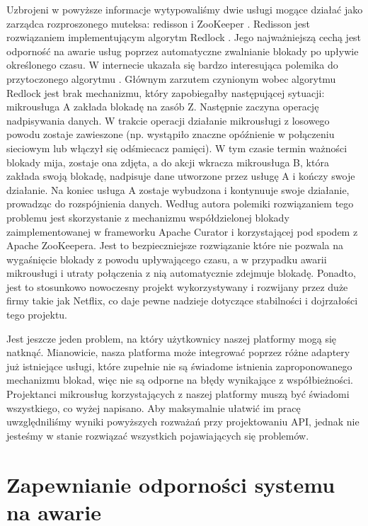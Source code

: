 \documentclass[licencjacka]{pracamgr}
\begin{document}
Uzbrojeni w powyższe informacje wytypowaliśmy dwie usługi mogące działać jako zarządca rozproszonego muteksa:
redisson \cite{redisson} i ZooKeeper \cite{zookeeper}. Redisson jest rozwiązaniem implementującym algorytm Redlock
\cite{redislock}. Jego najważniejszą cechą jest odporność na awarie usług poprzez automatyczne zwalnianie blokady
po upływie określonego czasu. W internecie ukazała się bardzo interesująca polemika do przytoczonego algorytmu \cite{redisbad}.
Głównym zarzutem czynionym wobec algorytmu Redlock jest brak mechanizmu, który zapobiegałby następującej sytuacji:
mikrousługa A zakłada blokadę na zasób Z. Następnie zaczyna operację nadpisywania danych. W trakcie operacji
działanie mikrousługi z losowego powodu zostaje zawieszone (np. wystąpiło znaczne opóźnienie w połączeniu sieciowym
lub włączył się odśmiecacz pamięci). W tym czasie termin ważności blokady mija, zostaje ona zdjęta, a do akcji
wkracza mikrousługa B, która zakłada swoją blokadę, nadpisuje dane utworzone przez usługę A i kończy swoje
działanie. Na koniec usługa A zostaje wybudzona i kontynuuje swoje działanie, prowadząc do rozspójnienia danych.
Według autora polemiki rozwiązaniem tego problemu jest skorzystanie z mechanizmu współdzielonej blokady
zaimplementowanej w frameworku Apache Curator \cite{curatorlock} i korzystającej pod spodem z Apache ZooKeepera.
Jest to bezpieczniejsze rozwiązanie które nie pozwala na wygaśnięcie blokady z powodu upływającego
czasu, a w przypadku awarii mikrousługi i utraty połączenia z nią
automatycznie zdejmuje blokadę. Ponadto, jest to stosunkowo nowoczesny projekt wykorzystywany i rozwijany przez
duże firmy takie jak Netflix, co daje pewne nadzieje dotyczące stabilności i dojrzałości tego projektu.

Jest jeszcze jeden problem, na który użytkownicy naszej platformy mogą się natknąć. Mianowicie, nasza platforma
może integrować poprzez różne adaptery już istniejące usługi, które zupełnie nie są świadome istnienia
zaproponowanego mechanizmu blokad, więc nie są odporne na błędy wynikające z współbieżności.
Projektanci mikrousług korzystających z naszej platformy muszą być świadomi wszystkiego, co wyżej napisano.
Aby maksymalnie ułatwić im pracę uwzględniliśmy wyniki powyższych rozważań  przy projektowaniu API, jednak nie
jesteśmy w stanie rozwiązać wszystkich pojawiających się problemów.

\section{Zapewnianie odporności systemu na awarie}
\end{document}
